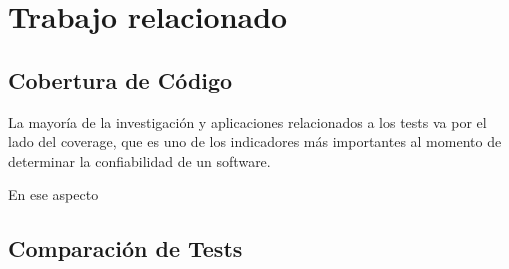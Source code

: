 \chapter{Trabajo relacionado}

\section{Cobertura de Código}
\par La mayoría de la investigación y aplicaciones relacionados a los tests va por el lado del coverage, que es uno de los indicadores más importantes al momento de determinar la confiabilidad de un software. 
\par En ese aspecto

\section{Comparación de Tests}
